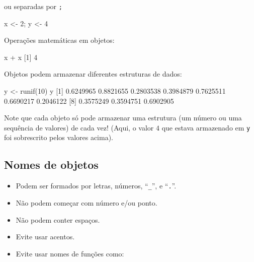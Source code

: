 \documentclass[
  10pt,
  a4paper]{book}
\newenvironment{Shaded}{\begin{snugshade}}{\end{snugshade}}
\newcommand{\DecValTok}[1]{\textcolor[rgb]{0.00,0.00,0.81}{#1}}
\newcommand{\FloatTok}[1]{\textcolor[rgb]{0.00,0.00,0.81}{#1}}
\newcommand{\FunctionTok}[1]{\textcolor[rgb]{0.00,0.00,0.00}{#1}}
\newcommand{\NormalTok}[1]{#1}
\newcommand{\OtherTok}[1]{\textcolor[rgb]{0.56,0.35,0.01}{#1}}
\newcommand{\SpecialCharTok}[1]{\textcolor[rgb]{0.00,0.00,0.00}{#1}}
\providecommand{\tightlist}{%
  \setlength{\itemsep}{0pt}\setlength{\parskip}{0pt}}
\begin{document}
ou separadas por \texttt{;}

\begin{Shaded}
\begin{Highlighting}[]
\NormalTok{x }\OtherTok{\textless{}{-}} \DecValTok{2}\NormalTok{; y }\OtherTok{\textless{}{-}} \DecValTok{4}
\end{Highlighting}
\end{Shaded}

Operações matemáticas em objetos:

\begin{Shaded}
\begin{Highlighting}[]
\NormalTok{x }\SpecialCharTok{+}\NormalTok{ x}
\NormalTok{[}\DecValTok{1}\NormalTok{] }\DecValTok{4}
\end{Highlighting}
\end{Shaded}

Objetos podem armazenar diferentes estruturas de dados:

\begin{Shaded}
\begin{Highlighting}[]
\NormalTok{y }\OtherTok{\textless{}{-}} \FunctionTok{runif}\NormalTok{(}\DecValTok{10}\NormalTok{)}
\NormalTok{y}
\NormalTok{ [}\DecValTok{1}\NormalTok{] }\FloatTok{0.6249965} \FloatTok{0.8821655} \FloatTok{0.2803538} \FloatTok{0.3984879} \FloatTok{0.7625511} \FloatTok{0.6690217} \FloatTok{0.2046122}
\NormalTok{ [}\DecValTok{8}\NormalTok{] }\FloatTok{0.3575249} \FloatTok{0.3594751} \FloatTok{0.6902905}
\end{Highlighting}
\end{Shaded}

Note que cada objeto só pode armazenar uma estrutura (um número ou uma
sequência de valores) de cada vez! (Aqui, o valor \(4\) que estava
armazenado em \texttt{y} foi sobrescrito pelos valores acima).

\hypertarget{nomes-de-objetos}{%
\subsection{Nomes de objetos}\label{nomes-de-objetos}}

\begin{itemize}
\tightlist
\item
  Podem ser formados por letras, números, ``\texttt{\_}'', e ``\texttt{.}''.
\item
  Não podem começar com número e/ou ponto.
\item
  Não podem conter espaços.
\item
  Evite usar acentos.
\item
  Evite usar nomes de funções como:
\end{itemize}
\end{document}
